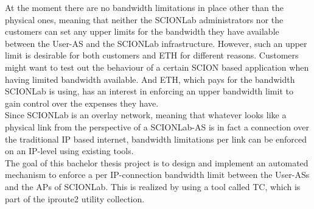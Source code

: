 At the moment there are no bandwidth limitations in place other than the physical ones, meaning that neither the \acs{SCIONLab} administrators nor the customers can set any upper limits for the bandwidth they have available between the User-\acs{AS} and the \acs{SCIONLab} infrastructure. However, such an upper limit is desirable for both customers and \acs{ETH} for different reasons. Customers might want to test out the behaviour of a certain \acs{SCION} based application when having limited bandwidth available. And \acs{ETH}, which pays for the bandwidth \acs{SCIONLab} is using, has an interest in enforcing an upper bandwidth limit to gain control over the expenses they have.
\\
Since \acs{SCIONLab} is an overlay network, meaning that whatever looks like a physical link from the perspective of a \acs{SCIONLab}-\acs{AS} is in fact a connection over the traditional \acs{IP} based internet, bandwidth limitations per link can be enforced on an \acs{IP}-level using existing tools.
\\
The goal of this bachelor thesis project is to design and implement an automated mechanism to enforce a per \acs{IP}-connection bandwidth limit between the User-\acsp{AS} and the \aclp{AP} of \acs{SCIONLab}. This is realized by using a tool called \ac{TC}, which is part of the iproute2 utility collection.

